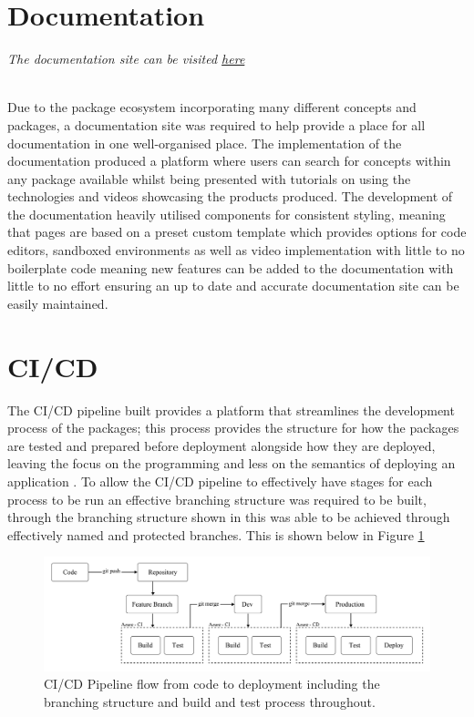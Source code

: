 \documentclass{l4proj}
\begin{document}
\section{Documentation}
\begin{center}
\textit{The documentation site can be visited \href{https://documentation-xi-liard.vercel.app/}{here}} 
\end{center}
\\
\text Due to the package ecosystem incorporating many different concepts and packages, a documentation site was required to help provide a place for all documentation in one well-organised place. The implementation of the documentation produced a platform where users can search for concepts within any package available whilst being presented with tutorials on using the technologies and videos showcasing the products produced. The development of the documentation heavily utilised components for consistent styling, meaning that pages are based on a preset custom template which provides options for code editors, sandboxed environments as well as video implementation with little to no boilerplate code meaning new features can be added to the documentation with little to no effort ensuring an up to date and accurate documentation site can be easily maintained.

\section{CI/CD}
The CI/CD pipeline built provides a platform that streamlines the development process of the packages; this process provides the structure for how the packages are tested and prepared before deployment alongside how they are deployed, leaving the focus on the programming and less on the semantics of deploying an application \cite{CICD}. To allow the CI/CD pipeline to effectively have stages for each process to be run an effective branching structure was required to be built, through the branching structure shown in \cite{FeatureBranching} this was able to be achieved through effectively named and protected branches. This is shown below in Figure \ref{fig:CICDPipeline}  

\begin{figure}[!ht]
    \begin{center}
        
    
    \includegraphics[width=12cm]{dissertation/images/CICD-structure.png}
    \end{center}
    \caption{CI/CD Pipeline flow from code to deployment including the branching structure and build and test process throughout.}
    \label{fig:CICDPipeline}
\end{figure}
\end{document}
